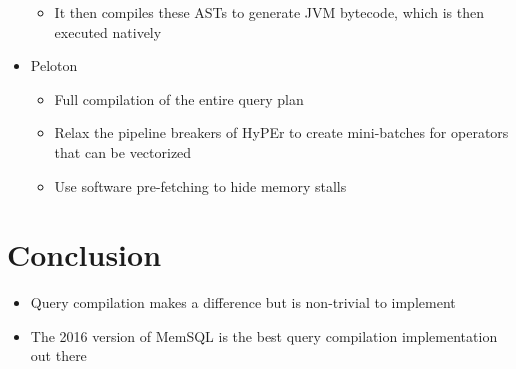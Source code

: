 \documentclass[11pt]{article}
\begin{document}
\begin{itemize}
\begin{itemize}
        \item It then compiles these ASTs to generate JVM bytecode, which is then executed natively
    \end{itemize}
    \item Peloton
    \begin{itemize}
        \item Full compilation of the entire query plan
        \item Relax the pipeline breakers of HyPEr to create mini-batches for operators that can be vectorized
        \item Use software pre-fetching to hide memory stalls
    \end{itemize}
\end{itemize}

\section{Conclusion}
\begin{itemize}
    \item Query compilation makes a difference but is non-trivial to implement
    \item The 2016 version of MemSQL is the best query compilation implementation out there
\end{itemize}

\newpage


\end{document}
